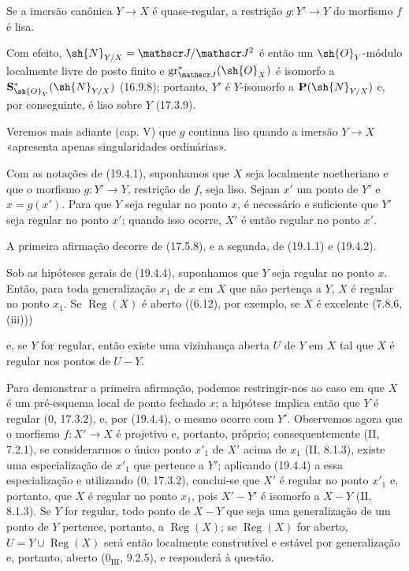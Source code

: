 \begin{corollary}[19.4.3]
\label{IV.19.4.3}
Se a imersão canônica $Y\to X$ é quase-regular, a restrição $g:Y'\to Y$ do morfismo $f$ é lisa.
\end{corollary}

Com efeito, $\sh{N}_{Y/X}=\mathscr J/\mathscr J^2$ é então um $\sh{O}_Y$-módulo localmente livre de posto finito e $\operatorname{gr}_{\mathscr J}^*(\sh{O}_X)$ é isomorfo a $\mathbf S_{\sh{O}_Y}^*(\sh{N}_{Y/X})$ (16.9.8); portanto, $Y'$ é $Y$-isomorfo a $\mathbf P(\sh{N}_{Y/X})$ e, por conseguinte, é liso sobre $Y$ (17.3.9).

Veremos mais adiante (cap. V) que $g$ continua liso quando a imersão $Y\to X$ «apresenta apenas singularidades ordinárias».

\begin{proposition}[19.4.4]
\label{IV.19.4.4}
Com as notações de (19.4.1), suponhamos que $X$ seja localmente noetheriano e que o morfismo $g:Y'\to Y$, restrição de $f$, seja liso. Sejam $x'$ um ponto de $Y'$ e $x=g(x')$. Para que $Y$ seja regular no ponto $x$, é necessário e suficiente que $Y'$ seja regular no ponto $x'$; quando isso ocorre, $X'$ é então regular no ponto $x'$.
\end{proposition}

A primeira afirmação decorre de (17.5.8), e a segunda, de (19.1.1) e (19.4.2).

\begin{corollary}[19.4.5]
\label{IV.19.4.5}
Sob as hipóteses gerais de (19.4.4), suponhamos que $Y$ seja regular no ponto $x$. Então, para toda generalização $x_1$ de $x$ em $X$ que não pertença a $Y$, $X$ é regular no ponto $x_1$. Se $\operatorname{Reg}(X)$ é aberto ((6.12), por exemplo, se $X$ é excelente (7.8.6, (iii)))


e, se $Y$ for regular, então existe uma vizinhança aberta $U$ de $Y$ em $X$ tal que $X$ é regular nos pontos de $U-Y$.
\end{corollary}

Para demonstrar a primeira afirmação, podemos restringir-nos ao caso em que $X$ é um pré-esquema local de ponto fechado $x$; a hipótese implica então que $Y$ é regular ($0$, 17.3.2), e, por (19.4.4), o mesmo ocorre com $Y'$. Observemos agora que o morfismo $f:X'\to X$ é projetivo e, portanto, próprio; consequentemente (II, 7.2.1), se considerarmos o único ponto $x'_1$ de $X'$ acima de $x_1$ (II, 8.1.3), existe uma especialização de $x'_1$ que pertence a $Y'$; aplicando (19.4.4) a essa especialização e utilizando ($0$, 17.3.2), conclui-se que $X'$ é regular no ponto $x'_1$ e, portanto, que $X$ é regular no ponto $x_1$, pois $X'-Y'$ é isomorfo a $X-Y$ (II, 8.1.3). Se $Y$ for regular, todo ponto de $X-Y$ que seja uma generalização de um ponto de $Y$ pertence, portanto, a $\operatorname{Reg}(X)$; se $\operatorname{Reg}(X)$ for aberto, $U=Y\cup\operatorname{Reg}(X)$ será então localmente construtível e estável por generalização e, portanto, aberto ($0_{\mathrm{III}}$, 9.2.5), e responderá à questão.

